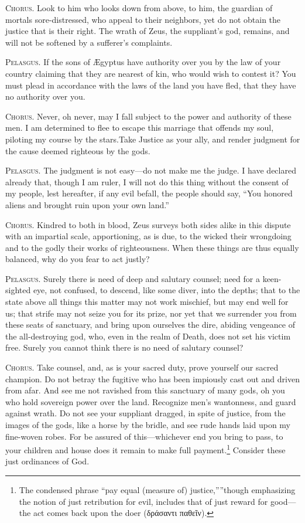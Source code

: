 \documentclass[12pt]{article}
\begin{document}
\textsc{Chorus.} Look to him who looks down from above, to him, the guardian of mortals sore-distressed, who appeal to their neighbors, yet do not obtain the justice that is their right. The wrath of Zeus, the suppliant's god, remains, and will not be softened by a sufferer's complaints.

\textsc{Pelasgus.} If the sons of {\AE}gyptus have authority over you by the law of your country claiming that they are nearest of kin, who would wish to contest it? You must plead in accordance with the laws of the land you have fled, that they have no authority over you.

\textsc{Chorus.} Never, oh never, may I fall subject to the power and authority of these men. I am determined to flee to escape this marriage that offends my soul, piloting my course by the stars.Take Justice as your ally, and render judgment for the cause deemed righteous by the gods.

\textsc{Pelasgus.} The judgment is not easy---do not make me the judge. I have declared already that, though I am ruler, I will not do this thing without the consent of my people, lest hereafter, if any evil befall, the people should say, ``You honored aliens and brought ruin upon your own land.''

\textsc{Chorus.} Kindred to both in blood, Zeus surveys both sides alike in this dispute with an impartial scale, apportioning, as is due, to the wicked their wrongdoing and to the godly their works of righteousness. When these things are thus equally balanced, why do you fear to act justly?

\textsc{Pelasgus.} Surely there is need of deep and salutary counsel; need for a keen-sighted eye, not confused, to descend, like some diver, into the depths; that to the state above all things this matter may not work mischief, but may end well for us; that strife may not seize you for its prize, nor yet that we surrender you from these seats of sanctuary, and bring upon ourselves the dire, abiding vengeance of the all-destroying god, who, even in the realm of Death, does not set his victim free. Surely you cannot think there is no need of salutary counsel?

\textsc{Chorus.} Take counsel, and, as is your sacred duty, prove yourself our sacred champion. Do not betray the fugitive who has been impiously cast out and driven from afar. And see me not ravished from this sanctuary of many gods, oh you who hold sovereign power over the land. Recognize men's wantonness, and guard against wrath. Do not see your suppliant dragged, in spite of justice, from the images of the gods, like a horse by the bridle, and see rude hands laid upon my fine-woven robes. For be assured of this---whichever end you bring to pass, to your children and house does it remain to make full payment.\footnote{The condensed phrase ``pay equal (measure of) justice,”''though emphasizing the notion of just retribution for evil, includes that of just reward for good—the act comes back upon the doer (δράσαντι παθεῖν).} Consider these just ordinances of God.
\end{document}
